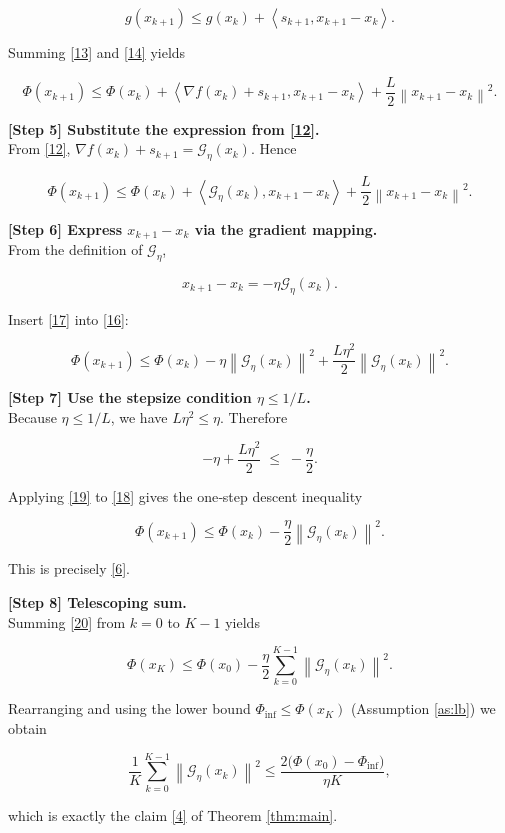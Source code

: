 \documentclass{article}
\newcommand{\grad}{\nabla}
\newcommand{\norm}[1]{\left\|#1\right\|}
\newcommand{\inner}[2]{\left\langle #1,#2\right\rangle}
\begin{document}
\[
g(x_{k+1})\le g(x_k)+\inner{s_{k+1}}{x_{k+1}-x_k}.
\tag{14}
\]

Summing \eqref{13} and \eqref{14} yields  

\[
\Phi(x_{k+1})\le \Phi(x_k)
+\inner{\grad f(x_k)+s_{k+1}}{x_{k+1}-x_k}
+\frac{L}{2}\norm{x_{k+1}-x_k}^{2}.
\tag{15}
\]

\noindent\textbf{[Step 5] Substitute the expression from \eqref{12}.}\\
From \eqref{12}, $\grad f(x_k)+s_{k+1}= \mathcal{G}_{\eta}(x_k)$. Hence  

\[
\Phi(x_{k+1})\le \Phi(x_k)
+\inner{\mathcal{G}_{\eta}(x_k)}{x_{k+1}-x_k}
+\frac{L}{2}\norm{x_{k+1}-x_k}^{2}.
\tag{16}
\]

\noindent\textbf{[Step 6] Express $x_{k+1}-x_k$ via the gradient mapping.}\\
From the definition of $\mathcal{G}_{\eta}$,  

\[
x_{k+1}-x_k = -\eta \mathcal{G}_{\eta}(x_k).
\tag{17}
\]

Insert \eqref{17} into \eqref{16}:

\[
\Phi(x_{k+1})\le \Phi(x_k)
-\eta\norm{\mathcal{G}_{\eta}(x_k)}^{2}
+\frac{L\eta^{2}}{2}\norm{\mathcal{G}_{\eta}(x_k)}^{2}.
\tag{18}
\]

\noindent\textbf{[Step 7] Use the stepsize condition $\eta\le 1/L$.}\\
Because $\eta\le 1/L$, we have $L\eta^{2}\le\eta$. Therefore  

\[
-\eta+\frac{L\eta^{2}}{2}\;\le\; -\frac{\eta}{2}.
\tag{19}
\]

Applying \eqref{19} to \eqref{18} gives the one‑step descent inequality  

\[
\boxed{\Phi(x_{k+1})\le \Phi(x_k)-\frac{\eta}{2}\norm{\mathcal{G}_{\eta}(x_k)}^{2}}.
\tag{20}
\]

This is precisely \eqref{6}.

\noindent\textbf{[Step 8] Telescoping sum.}\\
Summing \eqref{20} from $k=0$ to $K-1$ yields  

\[
\Phi(x_{K})\le \Phi(x_{0})
-\frac{\eta}{2}\sum_{k=0}^{K-1}\norm{\mathcal{G}_{\eta}(x_k)}^{2}.
\tag{21}
\]

Rearranging and using the lower bound $\Phi_{\inf}\le\Phi(x_{K})$ (Assumption \ref{as:lb}) we obtain  

\[
\frac{1}{K}\sum_{k=0}^{K-1}\norm{\mathcal{G}_{\eta}(x_k)}^{2}
\le \frac{2\bigl(\Phi(x_{0})-\Phi_{\inf}\bigr)}{\eta K},
\tag{22}
\]

which is exactly the claim \eqref{4} of Theorem \ref{thm:main}.  
\end{document}
